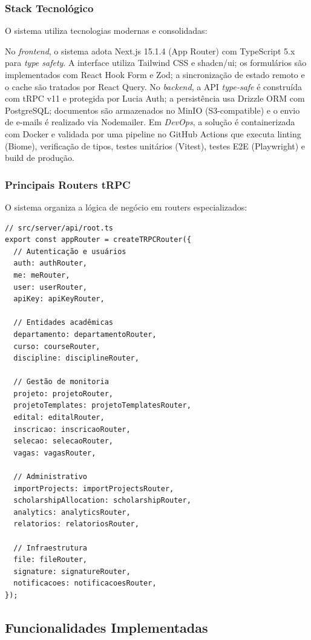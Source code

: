 \documentclass[portuguese]{sbc2025}%
\begin{document}
\subsubsection{Stack Tecnológico}

O sistema utiliza tecnologias modernas e consolidadas:

No \textit{frontend}, o sistema adota Next.js 15.1.4 (App Router) com TypeScript 5.x para \textit{type safety}. A interface utiliza Tailwind CSS e shadcn/ui; os formulários são implementados com React Hook Form e Zod; a sincronização de estado remoto e o cache são tratados por React Query. No \textit{backend}, a API \textit{type-safe} é construída com tRPC v11 e protegida por Lucia Auth; a persistência usa Drizzle ORM com PostgreSQL; documentos são armazenados no MinIO (S3-compatible) e o envio de e-mails é realizado via Nodemailer. Em \textit{DevOps}, a solução é containerizada com Docker e validada por uma pipeline no GitHub Actions que executa linting (Biome), verificação de tipos, testes unitários (Vitest), testes E2E (Playwright) e build de produção.

\subsubsection{Principais Routers tRPC}

O sistema organiza a lógica de negócio em routers especializados:

\begin{verbatim}
// src/server/api/root.ts
export const appRouter = createTRPCRouter({
  // Autenticação e usuários
  auth: authRouter,
  me: meRouter,
  user: userRouter,
  apiKey: apiKeyRouter,

  // Entidades acadêmicas
  departamento: departamentoRouter,
  curso: courseRouter,
  discipline: disciplineRouter,

  // Gestão de monitoria
  projeto: projetoRouter,
  projetoTemplates: projetoTemplatesRouter,
  edital: editalRouter,
  inscricao: inscricaoRouter,
  selecao: selecaoRouter,
  vagas: vagasRouter,

  // Administrativo
  importProjects: importProjectsRouter,
  scholarshipAllocation: scholarshipRouter,
  analytics: analyticsRouter,
  relatorios: relatoriosRouter,

  // Infraestrutura
  file: fileRouter,
  signature: signatureRouter,
  notificacoes: notificacoesRouter,
});
\end{verbatim}

\subsection{Funcionalidades Implementadas}
\end{document}
